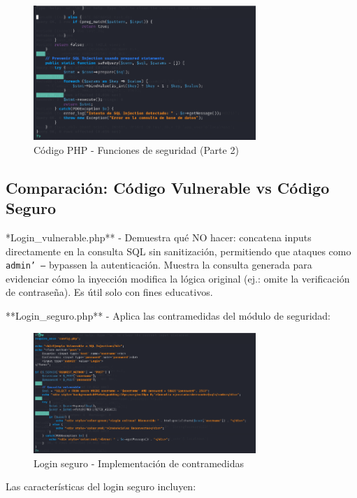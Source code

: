 \documentclass[12pt,a4paper]{article}
\begin{document}
\begin{figure}[H]
    \centering
    \includegraphics[width=0.75\textwidth]{./assets/img6.png}
    \caption{Código PHP - Funciones de seguridad (Parte 2)}
    \label{fig:php-seguridad-2}
\end{figure}

\subsection{Comparación: Código Vulnerable vs Código Seguro}

\**Login\_vulnerable.php** - Demuestra qué NO hacer: concatena inputs directamente en la consulta SQL sin sanitización, permitiendo que ataques como \texttt{admin' --} bypassen la autenticación. Muestra la consulta generada para evidenciar cómo la inyección modifica la lógica original (ej.: omite la verificación de contraseña). Es útil solo con fines educativos.

**Login\_seguro.php** - Aplica las contramedidas del módulo de seguridad:

\begin{figure}[H]
    \centering
    \includegraphics[width=0.75\textwidth]{./assets/img7.png}
    \caption{Login seguro - Implementación de contramedidas}
    \label{fig:login-seguro}
\end{figure}

Las características del login seguro incluyen:
\end{document}
